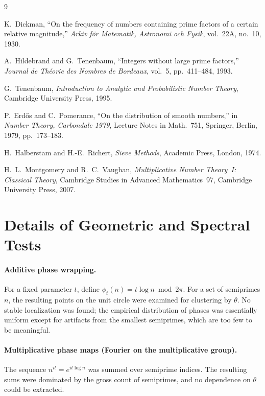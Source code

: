 \documentclass[11pt]{article}
\theoremstyle{definition}
\begin{document}
\begin{thebibliography}{9}

K.~Dickman,
``On the frequency of numbers containing prime factors of a certain relative
  magnitude,''
\textit{Arkiv f\"{o}r Matematik, Astronomi och Fysik},
vol.~22A, no.~10, 1930.

A.~Hildebrand and G.~Tenenbaum,
``Integers without large prime factors,''
\textit{Journal de Th\'{e}orie des Nombres de Bordeaux},
vol.~5, pp.~411--484, 1993.

G.~Tenenbaum,
\textit{Introduction to Analytic and Probabilistic Number Theory},
Cambridge University Press, 1995.

P.~Erd\H{o}s and C.~Pomerance,
``On the distribution of smooth numbers,''
in \textit{Number Theory, Carbondale 1979}, Lecture Notes in Math.\ 751,
Springer, Berlin, 1979, pp.~173--183.

H.~Halberstam and H.-E.~Richert,
\textit{Sieve Methods},
Academic Press, London, 1974.

H.~L.~Montgomery and R.~C.~Vaughan,
\textit{Multiplicative Number Theory~I: Classical Theory},
Cambridge Studies in Advanced Mathematics~97,
Cambridge University Press, 2007.

\end{thebibliography}


\appendix

\section{Details of Geometric and Spectral Tests}
\label{app:embeddings}

\paragraph{Additive phase wrapping.}
For a fixed parameter \(t\), define \(\phi_t(n) = t\log n \bmod 2\pi\).  For a set of
semiprimes \(n\), the resulting points on the unit circle were examined for
clustering by \(\theta\).  No stable localization was found; the empirical
distribution of phases was essentially uniform except for artifacts from the
smallest semiprimes, which are too few to be meaningful.

\paragraph{Multiplicative phase maps (Fourier on the multiplicative group).}
The sequence \(n^{it} = e^{it\log n}\) was summed over semiprime indices.  The
resulting sums were dominated by the gross count of semiprimes, and no dependence
on \(\theta\) could be extracted.
\end{document}
